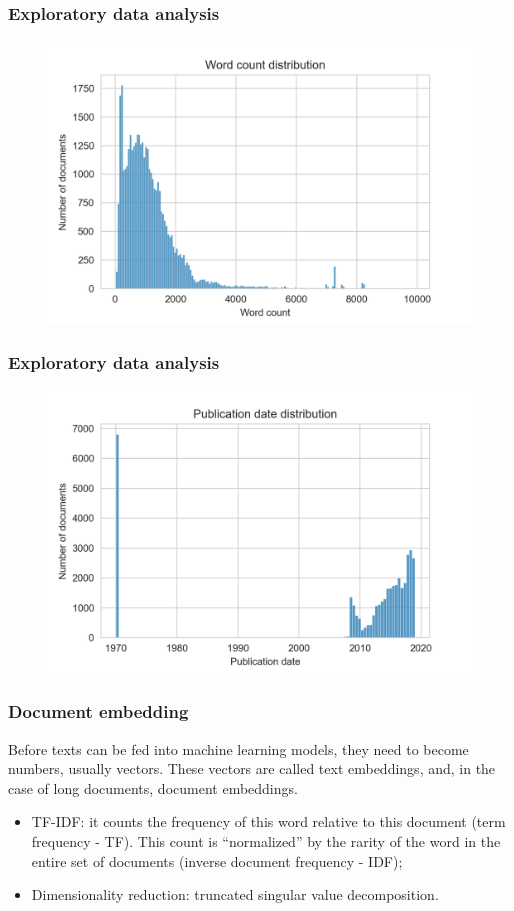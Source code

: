 \documentclass{beamer}
\begin{document}
    \begin{frame}
        \frametitle{Exploratory data analysis}
        \begin{figure}
            \centering
            \includegraphics[width=0.8\linewidth]{word_count.png}
        \end{figure}
    \end{frame}

    \begin{frame}
        \frametitle{Exploratory data analysis}
        \begin{figure}
            \centering
            \includegraphics[width=0.8\linewidth]{dates.png}
        \end{figure}
    \end{frame}

    \begin{frame}
        \frametitle{Document embedding}
        Before texts can be fed into machine learning models, they need to become numbers, usually vectors. These vectors are called text embeddings, and, in the case of long documents, document embeddings. \pause
        \begin{itemize}
            \item TF-IDF: it counts the frequency of this word relative to this document (term frequency - TF). This count is ``normalized'' by the rarity of the word in the entire set of documents (inverse document frequency - IDF); \pause
            \item Dimensionality reduction: truncated singular value decomposition.
        \end{itemize}
    \end{frame}
\end{document}
